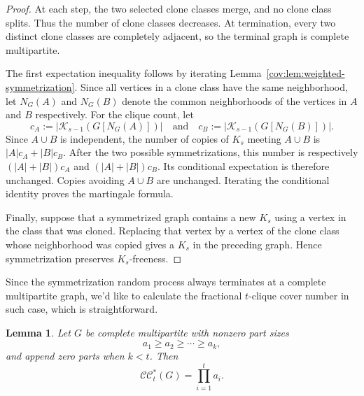 \documentclass[11pt]{article}
\numberwithin{equation}{section}
\newtheorem{lemma}[theorem]{Lemma}
\theoremstyle{remark}
\newcommand{\CCstar}{\mathcal{CC}^{*}}
\begin{document}
\begin{proof}
At each step, the two selected clone classes merge, and no clone class splits.
Thus the number of clone classes decreases.  At termination, every two distinct clone classes
are completely adjacent, so the terminal graph is complete multipartite.

The first expectation inequality follows by iterating Lemma~\ref{cov:lem:weighted-symmetrization}.
Since all vertices in a clone class have the same neighborhood, let \(N_G(A)\) and \(N_G(B)\) denote
the common neighborhoods of the vertices in \(A\) and \(B\) respectively.  For the clique count, let
\begin{equation*}
c_A:=|\mathcal K_{s-1}(G[N_G(A)])|
\quad\text{and}\quad
c_B:=|\mathcal K_{s-1}(G[N_G(B)])|.
\end{equation*}
Since \(A\cup B\) is independent, the number of copies of \(K_s\) meeting \(A\cup B\) is \(|A|c_A+|B|c_B\).
After the two possible symmetrizations, this number is respectively \((|A|+|B|)c_A\) and \((|A|+|B|)c_B\).
Its conditional expectation is therefore unchanged.  Copies avoiding \(A\cup B\) are unchanged.
Iterating the conditional identity proves the martingale formula.

Finally, suppose that a symmetrized graph contains a new \(K_s\) using a vertex
in the class that was cloned. Replacing that vertex by a vertex of the clone class
whose neighborhood was copied gives a \(K_s\) in the preceding graph.
Hence symmetrization preserves \(K_s\)-freeness.
\end{proof}

Since the symmetrization random process always terminates at a complete multipartite graph,
we'd like to calculate the fractional \(t\)-clique cover number in such case, which is straightforward.

\begin{lemma}\label{cov:lem:multipartite-value}
Let \(G\) be complete multipartite with nonzero part sizes
\begin{equation*}
a_1\ge a_2\ge\cdots\ge a_k,
\end{equation*}
and append zero parts when \(k<t\).  Then
\begin{equation*}
\CCstar_t(G)=\prod_{i=1}^t a_i.
\end{equation*}
\end{lemma}
\end{document}

